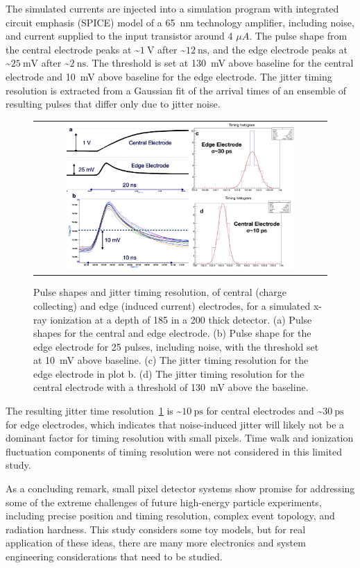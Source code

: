 The simulated currents are injected into a simulation program with integrated circuit emphasis (SPICE) model of a \SI{65}{\nm} technology amplifier, including noise, and current supplied to the input transistor around 4 $\mu A$.
The pulse shape from the central electrode peaks at \sim$\SI{1}{\V}$ after \sim$\SI{12}{\ns}$, and the edge electrode peaks at \sim$\SI{25}{\mV}$ after \sim$\SI{2}{\ns}$.
The threshold is set at \SI{130}{\mV} above baseline for the central electrode and \SI{10}{\mV} above baseline for the edge electrode.
The jitter timing resolution is extracted from a Gaussian fit of the arrival times of an ensemble of resulting pulses that differ only due to jitter noise.
\begin{figure}[htb]
  \begin{center}
    \begin{tabular}{c}
      \includegraphics[width=0.80\textwidth]{fig_FastTiming/TimingResolutions.png}
    \end{tabular}
    \caption{Pulse shapes and jitter timing resolution, of central (charge collecting) and edge (induced current) electrodes, for a simulated x-ray ionization at a depth of \SI{185}{\micron} in a \SI{200}{\micron} thick detector.
        (a) Pulse shapes for the central and edge electrode. 
        (b) Pulse shape for the edge electrode for 25 pulses, including noise, with the threshold set at \SI{10}{\mV} above baseline.
        (c) The jitter timing resolution for the edge electrode in plot b.
        (d) The jitter timing resolution for the central electrode with a threshold of \SI{130}{\mV} above the baseline.
            }
    \label{TimingResolutions}
  \end{center}
\end{figure}

The resulting jitter time resolution~\ref{TimingResolutions} is \sim$\SI{10}{\ps}$ for central electrodes and \sim$\SI{30}{\ps}$ for edge electrodes, which indicates that noise-induced jitter will likely not be a dominant factor for timing resolution with small pixels.
Time walk and ionization fluctuation components of timing resolution were not considered in this limited study.

As a concluding remark, small pixel detector systems show promise for addressing some of the extreme challenges of future high-energy particle experiments, including precise position and timing resolution, complex event topology, and radiation hardness.
This study considers some toy models, but for real application of these ideas, there are many more electronics and system engineering considerations that need to be studied.